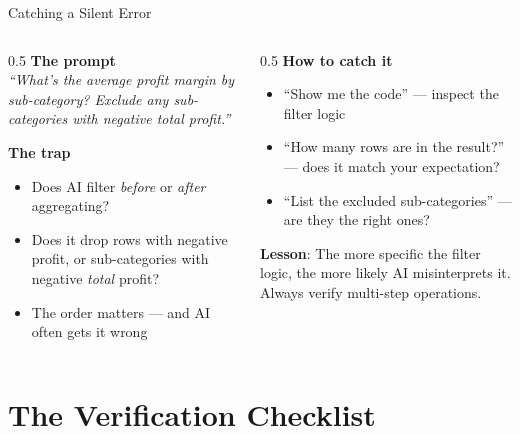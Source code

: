 \documentclass[aspectratio=169]{beamer}
\begin{document}
\begin{frame}{Catching a Silent Error}
\begin{columns}[T]
\begin{column}{0.5\textwidth}
\textbf{The prompt}\\[0.3em]
\small\textit{``What's the average profit margin by sub-category? Exclude any sub-categories with negative total profit.''}
\vspace{0.3cm}

\textbf{The trap}
\begin{itemize}\small
  \item Does AI filter \textit{before} or \textit{after} aggregating?
  \item Does it drop rows with negative profit, or sub-categories with negative \textit{total} profit?
  \item The order matters --- and AI often gets it wrong
\end{itemize}
\end{column}
\begin{column}{0.5\textwidth}
\textbf{How to catch it}
\begin{itemize}\small
  \item \alert{``Show me the code''} --- inspect the filter logic
  \item \alert{``How many rows are in the result?''} --- does it match your expectation?
  \item \alert{``List the excluded sub-categories''} --- are they the right ones?
\end{itemize}
\vspace{0.3cm}
\textbf{Lesson}: The more specific the filter logic, the more likely AI misinterprets it. Always verify multi-step operations.
\end{column}
\end{columns}
\end{frame}

\section{The Verification Checklist}
\end{document}
